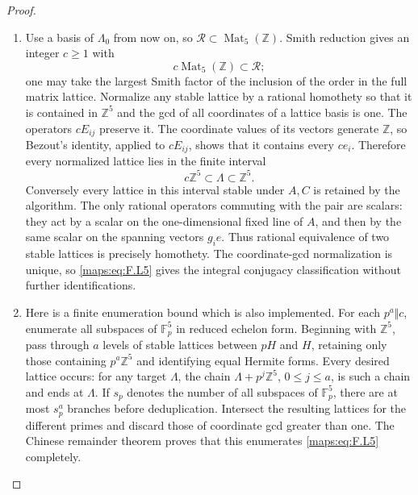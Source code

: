 \begin{proof}
\begin{enumerate}[label=\arabic*.]
\item Use a basis of $\Lambda_0$ from now on, so
$\mathcal R\subset\operatorname{Mat}_5(\mathbb Z)$.
Smith reduction gives an integer $c\ge1$ with
\[
 c\operatorname{Mat}_5(\mathbb Z)\subset\mathcal R;
 \tag{F.L4}\label{maps:eq:F.L4}
\]
one may take the largest Smith factor of the inclusion
of the order in the full matrix lattice.
Normalize any stable lattice by a rational homothety so
that it is contained in $\mathbb Z^5$ and the gcd of all
coordinates of a lattice basis is one.
The operators $cE_{ij}$ preserve it.  The coordinate values
of its vectors generate $\mathbb Z$, so Bezout's identity,
applied to $cE_{ij}$, shows that it contains every $ce_i$.
Therefore every normalized lattice lies in the finite interval
\[
 c\mathbb Z^5\subset\Lambda\subset\mathbb Z^5.
 \tag{F.L5}\label{maps:eq:F.L5}
\]
Conversely every lattice in this interval stable under
$A,C$ is retained by the algorithm.
The only rational operators commuting with the pair are
scalars: they act by a scalar on the one-dimensional fixed
line of $A$, and then by the same scalar on the spanning
vectors $g_ie$.  Thus rational equivalence of two stable
lattices is precisely homothety.  The coordinate-gcd
normalization is unique, so \eqref{maps:eq:F.L5} gives the integral
conjugacy classification without further identifications.

\item Here is a finite enumeration bound which is also implemented.
For each $p^a\Vert c$, enumerate all subspaces of
$\mathbb F_p^5$ in reduced echelon form.
Beginning with $\mathbb Z^5$, pass through $a$ levels of
stable lattices between $pH$ and $H$, retaining only those
containing $p^a\mathbb Z^5$ and identifying equal Hermite
forms.  Every desired lattice occurs: for any target
$\Lambda$, the chain
$\Lambda+p^j\mathbb Z^5$, $0\le j\le a$, is such a
chain and ends at $\Lambda$.
If $s_p$ denotes the number of all subspaces of
$\mathbb F_p^5$, there are at most $s_p^a$ branches before
deduplication.  Intersect the resulting lattices for the
different primes and discard those of coordinate gcd
greater than one.  The Chinese remainder theorem proves
that this enumerates \eqref{maps:eq:F.L5} completely.


\end{enumerate}
\end{proof}
